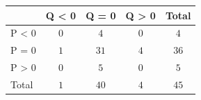 \begin{tabular}{l|ccc|c}
\toprule
 & Q \textless{} 0 & Q = 0 & Q \textgreater{} 0 & Total \\
\midrule
P \textless{} 0 & $0$ & $4$ & $0$ & $4$ \\
P = 0 & $1$ & $31$ & $4$ & $36$ \\
P \textgreater{} 0 & $0$ & $5$ & $0$ & $5$ \\
\midrule
Total & $1$ & $40$ & $4$ & $45$ \\
\end{tabular}
